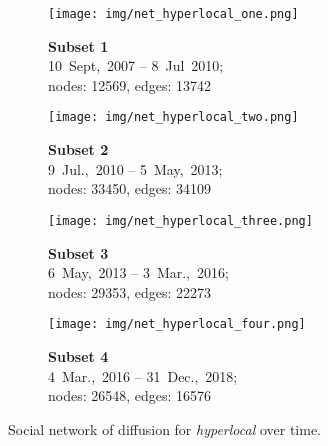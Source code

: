 \documentclass[
  a4paper,
  abstract=on,
  captions=tableabove,
  ]{scrartcl}
\newcommand{\ol}[1]{\emph{#1}}
\newcommand{\se}[1]{\textbf{#1}}
\begin{document}
      \begin{figure}
        \captionsetup[subfigure]{justification=centering}
        \centering
        \begin{subfigure}{.45\linewidth}
          \caption{\se{Subset 1}\\ 10~Sept,~2007 -- 8~Jul~2010;\\ nodes: \num{12569}, edges: \num{13742}}
          \label{subfig:net_diac_hyperlocal_one}
          \centering
          \texttt{[image: img/net\_hyperlocal\_one.png]}
        \end{subfigure}
        \begin{subfigure}{.45\linewidth}
          \caption{\se{Subset 2}\\ 9~Jul.,~2010 -- 5~May,~2013;\\ nodes: \num{33450}, edges: \num{34109}}
          \label{subfig:net_diac_hyperlocal_two}
          \centering
          \texttt{[image: img/net\_hyperlocal\_two.png]}
        \end{subfigure}

        \begin{subfigure}{.45\linewidth}
          \caption{\se{Subset 3}\\ 6~May,~2013 -- 3~Mar.,~2016;\\ nodes: \num{29353}, edges: \num{22273}}
          \label{subfig:net_diac_hyperlocal_three}
          \centering
          \texttt{[image: img/net\_hyperlocal\_three.png]}
        \end{subfigure}
        \begin{subfigure}{.45\linewidth}
          \caption{\se{Subset 4}\\ 4~Mar.,~2016 -- 31~Dec.,~2018;\\ nodes: \num{26548}, edges: \num{16576}}
          \label{subfig:net_diac_hyperlocal_four}
          \centering
          \texttt{[image: img/net\_hyperlocal\_four.png]}
        \end{subfigure}
        \caption[Social networks of diffusion for \ol{hyperlocal}]{Social network of diffusion for \ol{hyperlocal} over time.}
        \label{fig:net_diac_hyperlocal}
      \end{figure}
\end{document}
